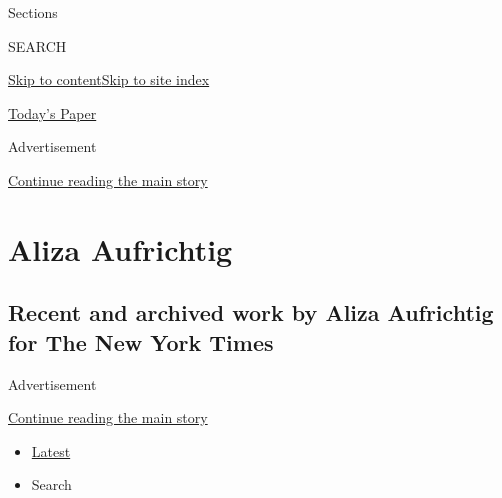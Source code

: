 Sections

SEARCH

\protect\hyperlink{site-content}{Skip to
content}\protect\hyperlink{site-index}{Skip to site index}

\href{https://myaccount.nytimes3xbfgragh.onion/auth/login?response_type=cookie\&client_id=vi}{}

\href{https://www.nytimes3xbfgragh.onion/section/todayspaper}{Today's
Paper}

Advertisement

\protect\hyperlink{after-top}{Continue reading the main story}

\hypertarget{aliza-aufrichtig}{%
\section{Aliza Aufrichtig}\label{aliza-aufrichtig}}

\hypertarget{recent-and-archived-work-by-aliza-aufrichtig-for-the-new-york-times}{%
\subsection{Recent and archived work by Aliza Aufrichtig for The New
York
Times}\label{recent-and-archived-work-by-aliza-aufrichtig-for-the-new-york-times}}

Advertisement

\protect\hyperlink{after-mid1}{Continue reading the main story}

\begin{itemize}
\tightlist
\item
  \protect\hyperlink{stream-panel}{Latest}
\item
  Search
\end{itemize}

